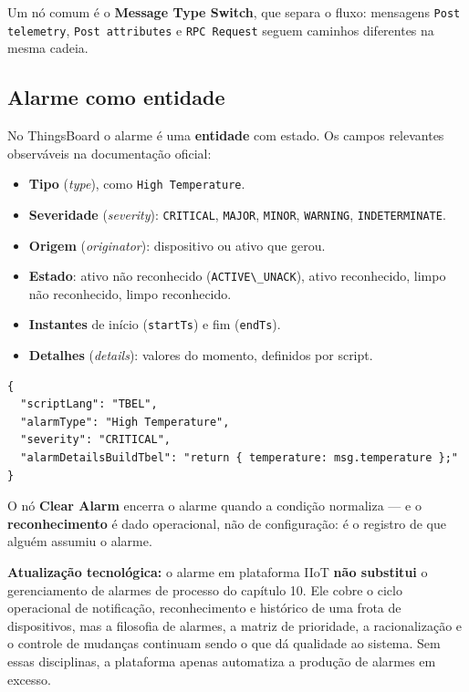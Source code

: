 Um nó comum é o \textbf{Message Type Switch}, que separa o fluxo: mensagens \passthrough{\lstinline!Post telemetry!}, \passthrough{\lstinline!Post attributes!} e \passthrough{\lstinline!RPC Request!} seguem caminhos diferentes na mesma cadeia.

\subsection{Alarme como entidade}\label{alarme-como-entidade}

No ThingsBoard o alarme é uma \textbf{entidade} com estado. Os campos relevantes observáveis na documentação oficial:

\begin{itemize}
\tightlist
\item
  \textbf{Tipo} (\emph{type}), como \passthrough{\lstinline!High Temperature!}.
\item
  \textbf{Severidade} (\emph{severity}): \passthrough{\lstinline!CRITICAL!}, \passthrough{\lstinline!MAJOR!}, \passthrough{\lstinline!MINOR!}, \passthrough{\lstinline!WARNING!}, \passthrough{\lstinline!INDETERMINATE!}.
\item
  \textbf{Origem} (\emph{originator}): dispositivo ou ativo que gerou.
\item
  \textbf{Estado}: ativo não reconhecido (\passthrough{\lstinline!ACTIVE\_UNACK!}), ativo reconhecido, limpo não reconhecido, limpo reconhecido.
\item
  \textbf{Instantes} de início (\passthrough{\lstinline!startTs!}) e fim (\passthrough{\lstinline!endTs!}).
\item
  \textbf{Detalhes} (\emph{details}): valores do momento, definidos por script.
\end{itemize}

\begin{lstlisting}
{
  "scriptLang": "TBEL",
  "alarmType": "High Temperature",
  "severity": "CRITICAL",
  "alarmDetailsBuildTbel": "return { temperature: msg.temperature };"
}
\end{lstlisting}

O nó \textbf{Clear Alarm} encerra o alarme quando a condição normaliza --- e o \textbf{reconhecimento} é dado operacional, não de configuração: é o registro de que alguém assumiu o alarme.

\begin{caixanota}

\textbf{Atualização tecnológica:} o alarme em plataforma IIoT \textbf{não substitui} o gerenciamento de alarmes de processo do capítulo 10. Ele cobre o ciclo operacional de notificação, reconhecimento e histórico de uma frota de dispositivos, mas a filosofia de alarmes, a matriz de prioridade, a racionalização e o controle de mudanças continuam sendo o que dá qualidade ao sistema. Sem essas disciplinas, a plataforma apenas automatiza a produção de alarmes em excesso.

\end{caixanota}

